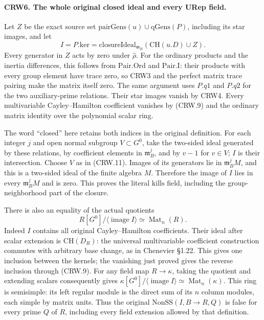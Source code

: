 \paragraph{CRW6. The whole original closed ideal and every URep field.}
\label{claim:CRW6}
Let $Z$ be the exact source set
$\mathrm{pairGens}(u)\cup\mathrm{qGens}(P)$, including its
star images, and let
\[
 I=P.\mathrm{ker}=\mathrm{closureIdeal}_{\mathfrak m_B}
                  (\mathrm{CH}(u.D)\cup Z).
\]
Every generator in $Z$ acts by zero under $\widehat\rho$.
For the ordinary products and the inertia differences, this
follows from $\mathrm{Pair.Ord}$ and $\mathrm{Pair.I}$:
their products with every group element have trace zero,
so CRW3 and the perfect matrix trace pairing make the matrix
itself zero.  The same argument uses $P.q1$ and $P.q2$ for
the two auxiliary-prime relations.  Their star images vanish
by CRW4.  Every multivariable Cayley--Hamilton coefficient
vanishes by (CRW.9) and the ordinary matrix identity over
the polynomial scalar ring.

The word ``closed'' here retains both indices in the original
definition.  For each integer $j$ and open normal subgroup
$V\subset G^0$, take the two-sided ideal generated by these
relations, by coefficient elements in $\mathfrak m_B^j$,
and by $v-1$ for $v\in V$; $I$ is their intersection.
Choose $V$ as in (CRW.11).  Images of its generators lie in
$\mathfrak m_B^jM$, and this is a two-sided ideal of the
finite algebra $M$.  Therefore the image of $I$ lies in
every $\mathfrak m_B^jM$ and is zero.  This proves the literal
$\mathrm{kills}$ field, including the group-neighborhood part
of the closure.

There is also an equality of the actual quotients
\[
 R[G^0]/\langle\operatorname{image} I\rangle
       \simeq\operatorname{Mat}_n(R).               \tag{CRW.12}
\]
Indeed $I$ contains all original Cayley--Hamilton coefficients.
Their ideal after scalar extension is $\mathrm{CH}(D_R)$:
the universal multivariable coefficient construction commutes
with arbitrary base change, as in Chenevier \S1.22.
This gives one inclusion between the kernels; the vanishing
just proved gives the reverse inclusion through (CRW.9).
For any field map $R\to\kappa$, taking the quotient and
extending scalars consequently gives
$\kappa[G^0]/\langle\operatorname{image}I\rangle
\simeq\operatorname{Mat}_n(\kappa)$.
This ring is semisimple: its left regular module is the direct
sum of its $n$ column modules, each simple by matrix units.
Thus the original $\mathrm{NonSS}(I,B\to R,Q)$ is false for
every prime $Q$ of $R$, including every field extension
allowed by that definition.

